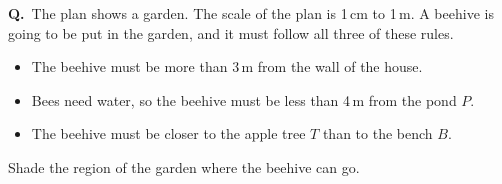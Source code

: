 \documentclass[12pt,a4paper]{article}
\newcounter{qn}
\newcommand{\q}{\refstepcounter{qn}\textbf{Q\theqn.}\ }
\newcommand{\place}[3]{\fill #1 circle (1.5pt); \node[lab,#2] at #1 {#3};}
\begin{document}
\noindent
\begin{minipage}[t]{0.37\linewidth}\raggedright
\q The plan shows a garden. The scale of the plan is 1\,cm to 1\,m.
A beehive is going to be put in the garden, and it must follow all
three of these rules.
\begin{itemize}
  \item[--] The beehive must be more than 3\,m from the wall of the
    house.
  \item[--] Bees need water, so the beehive must be less than 4\,m
    from the pond $P$.
  \item[--] The beehive must be closer to the apple tree $T$ than to
    the bench $B$.
\end{itemize}
\vspace{4pt}
Shade the region of the garden where the beehive can go.
\end{minipage}\hfill
\begin{minipage}[t]{0.6\linewidth}\raggedright
\raggedleft
{}
\end{minipage}

\vfill
\end{document}
